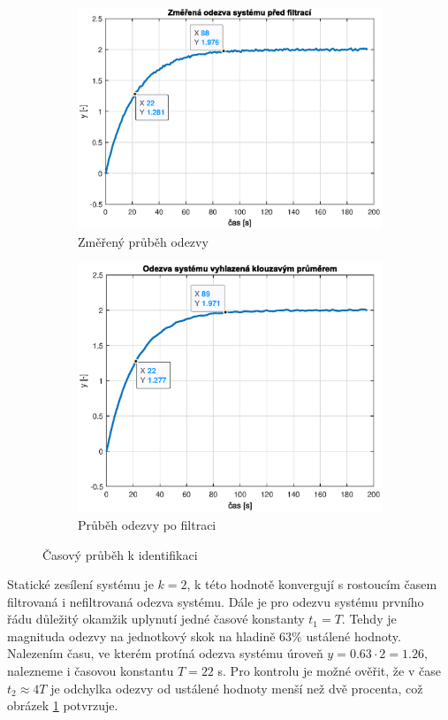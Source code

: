 \documentclass[twoside]{article}
\begin{document}
\begin{figure}[htbp]
	\centering
	\begin{subfigure}{0.45\textwidth}
		\includegraphics[width=\linewidth]{odezva1_raw.eps}
		\caption{Změřený průběh odezvy}
	\end{subfigure}
	\begin{subfigure}{0.45\textwidth}
		\includegraphics[width=\linewidth]{odezva1_filtered.eps}
		\caption{Průběh odezvy po filtraci}
	\end{subfigure}
	\caption{Časový průběh k identifikaci}
	\label{fig:zadani1}
\end{figure}

Statické zesílení systému je $k = 2$, k této hodnotě konvergují s rostoucím časem filtrovaná i nefiltrovaná odezva systému.
Dále je pro odezvu systému prvního řádu důležitý okamžik uplynutí jedné časové konstanty $t_1 = T$. Tehdy je magnituda
odezvy na jednotkový skok na hladině 63\% ustálené hodnoty. Nalezením času, ve kterém protíná odezva systému
úroveň $y = 0.63 \cdot 2 = 1.26$, nalezneme i časovou konstantu $T = 22$ s. Pro kontrolu je možné ověřit, 
že v čase $t_2 \approx 4T$ je odchylka odezvy od ustálené hodnoty menší než dvě procenta, což obrázek \ref{fig:zadani1} potvrzuje.
\end{document}
